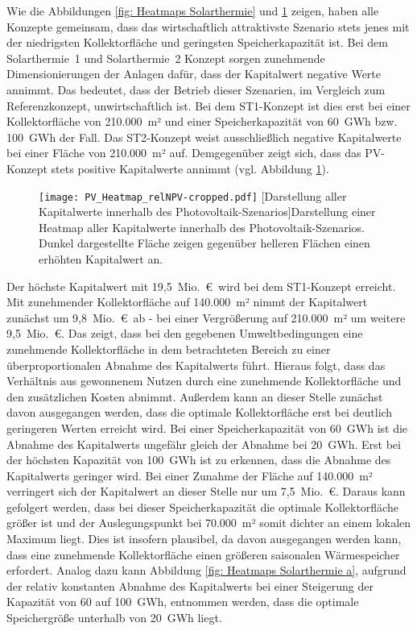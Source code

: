 Wie die Abbildungen \ref{fig: Heatmaps Solarthermie} und \ref{figure: Heatmap Photovoltaik} zeigen, haben alle Konzepte gemeinsam, dass das wirtschaftlich attraktivste Szenario stets jenes mit der niedrigsten Kollektorfläche und geringsten Speicherkapazität ist. Bei dem Solarthermie~1 und Solarthermie~2 Konzept sorgen zunehmende Dimensionierungen der Anlagen dafür, dass der Kapitalwert negative Werte annimmt. Das bedeutet, dass der Betrieb dieser Szenarien, im Vergleich zum Referenzkonzept, unwirtschaftlich ist. Bei dem ST1-Konzept ist dies erst bei einer Kollektorfläche von 210.000~m² und einer Speicherkapazität von 60~GWh bzw. 100~GWh der Fall. Das ST2-Konzept weist ausschließlich negative Kapitalwerte bei einer Fläche von 210.000~m² auf. Demgegenüber zeigt sich, dass das \ac{PV}-Konzept stets positive Kapitalwerte annimmt (vgl. Abbildung \ref{figure: Heatmap Photovoltaik}).
	\begin{figure}[ht]
		\centering
		\texttt{[image: PV\_Heatmap\_relNPV-cropped.pdf]}
		[Darstellung aller Kapitalwerte innerhalb des Photovoltaik-Szenarios]{Darstellung einer Heatmap aller Kapitalwerte innerhalb des Photovoltaik-Szenarios. Dunkel dargestellte Fläche zeigen gegenüber helleren Flächen einen erhöhten Kapitalwert an.}
		\label{figure: Heatmap Photovoltaik}
	\end{figure}

Der höchste Kapitalwert mit 19,5~Mio.~\euro\ wird bei dem ST1-Konzept erreicht. Mit zunehmender Kollektorfläche auf 140.000~m² nimmt der Kapitalwert zunächst um 9,8~Mio.~\euro\ ab - bei einer Vergrößerung auf 210.000~m² um weitere 9,5~Mio.~\euro. Das zeigt, dass bei den gegebenen Umweltbedingungen eine zunehmende Kollektorfläche in dem betrachteten Bereich zu einer überproportionalen Abnahme des Kapitalwerts führt. Hieraus folgt, dass das Verhältnis aus gewonnenem Nutzen durch eine zunehmende Kollektorfläche und den zusätzlichen Kosten abnimmt. Außerdem kann an dieser Stelle zunächst davon ausgegangen werden, dass die optimale Kollektorfläche erst bei deutlich geringeren Werten erreicht wird. Bei einer Speicherkapazität von 60~GWh ist die Abnahme des Kapitalwerts ungefähr gleich der Abnahme bei 20~GWh. Erst bei der höchsten Kapazität von 100~GWh ist zu erkennen, dass die Abnahme des Kapitalwerts geringer wird. Bei einer Zunahme der Fläche auf 140.000~m² verringert sich der Kapitalwert an dieser Stelle nur um 7,5~Mio.~\euro. Daraus kann gefolgert werden, dass bei dieser Speicherkapazität die optimale Kollektorfläche größer ist und der Auslegungspunkt bei 70.000~m² somit dichter an einem lokalen Maximum liegt. Dies ist insofern plausibel, da davon ausgegangen werden kann, dass eine zunehmende Kollektorfläche einen größeren saisonalen Wärmespeicher erfordert. Analog dazu kann Abbildung \ref{fig: Heatmaps Solarthermie a}, aufgrund der relativ konstanten Abnahme des Kapitalwerts bei einer Steigerung der Kapazität von 60 auf 100~GWh, entnommen werden, dass die optimale Speichergröße unterhalb von 20~GWh liegt.

